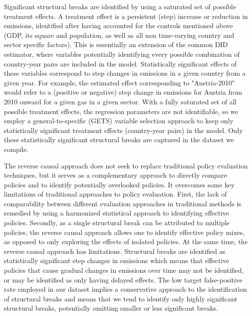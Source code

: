 \documentclass[a4paper]{article}
\begin{document}
Significant structural breaks are identified by using a saturated set of possible treatment effects. A treatment effect is a persistent (step) increase or reduction in emissions, identified after having accounted for the controls mentioned above (GDP, its square and population, as well as all non time-varying country and sector specific factors). This is essentially an extension of the common DID estimator, where variables potentially identifying every possible combination of country-year pairs are included in the model. Statistically significant effects of these variables correspond to step changes in emissions in a given country from a given year. For example, the estimated effect corresponding to "Austria-2010" would refer to a (positive or negative) step change in emissions for Austria from 2010 onward for a given gas in a given sector. With a fully saturated set of all possible treatment effects, the regression parameters are not identifiable, so we employ a general-to-specific (GETS) variable selection approach to keep only statistically significant treatment effects (country-year pairs) in the model. Only these statistically significant structural breaks are captured in the dataset we compile.

The reverse causal approach does not seek to replace traditional policy evaluation techniques, but it serves as a complementary approach to directly compare policies and to identify potentially overlooked policies. It overcomes some key limitations of traditional approaches to policy evaluation. First, the lack of comparability between different evaluation approaches in traditional methods is remedied by using a harmonized statistical approach to identifying effective policies. Secondly, as a single structural break can be attributed to multiple policies, the reverse causal approach allows one to identify effective policy mixes, as opposed to only exploring the effects of isolated policies. At the same time, the reverse causal approach has limitations. Structural breaks are identified as statistically significant step changes in emissions which means that effective policies that cause gradual changes in emissions over time may not be identified, or may be identified as only having delayed effects. The low target false-positive rate employed in our dataset implies a conservative approach to the identification of structural breaks and means that we tend to identify only highly significant structural breaks, potentially omitting smaller or less significant breaks.


\end{document}
